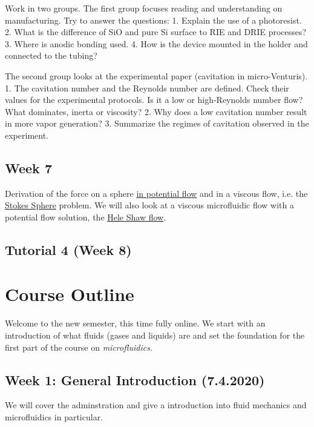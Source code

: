 \documentclass[11pt]{article}
\begin{document}
Work in two groups. The first group focuses reading and understanding on
manufacturing. Try to answer the questions: 1. Explain the use of a
photoresist. 2. What is the difference of SiO and pure Si surface to RIE
and DRIE processes? 3. Where is anodic bonding used. 4. How is the
device mounted in the holder and connected to the tubing?

The second group looks at the experimental paper (cavitation in
micro-Venturis). 1. The cavitation number and the Reynolds number are
defined. Check their values for the experimental protocols. Is it a low
or high-Reynolds number flow? What dominates, inerta or viscosity? 2.
Why does a low cavitation number result in more vapor generation? 3.
Summarize the regimes of cavitation observed in the experiment.

\subsection{Week 7}\label{week-7}

Derivation of the force on a sphere \href{Potential\%20Sphere.ipynb}{in
potential flow} and in a viscous flow, i.e. the
\href{Stokes\%20Sphere.ipynb}{Stokes Sphere} problem. We will also look
at a viscous microfluidic flow with a potential flow solution, the
\href{Hele\%20Shaw\%20Flow.ipynb}{Hele Shaw flow}.

\subsection{Tutorial 4 (Week 8)}\label{tutorial-4-week-8}

\section{Course Outline}\label{course-outline-1}

Welcome to the new semester, this time fully online. We start with an
introduction of what fluids (gases and liquids) are and set the
foundation for the first part of the course on \emph{microfluidics}.

\subsection{Week 1: General Introduction
(7.4.2020)}\label{week-1-general-introduction-7.4.2020-1}

We will cover the adminstration and give a introduction into fluid
mechanics and microfluidics in particular.
\end{document}
